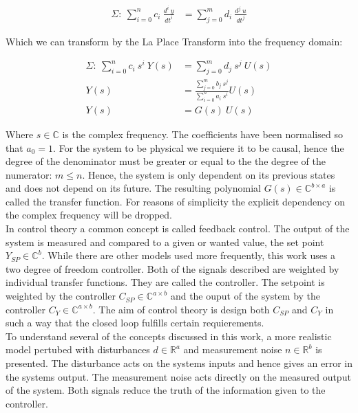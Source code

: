 \begin{align}
\label{eq:lti}
\Sigma:~\sum_{i=0}^{n} c_i ~\frac{d^i ~y}{dt^i} &= \sum_{j=0}^{m} d_i ~ \frac{d^j ~u}{dt^j} 
\end{align}

Which we can transform by the La Place Transform into the frequency domain:

\begin{align}
\label{eq:ltis}
\Sigma: ~\sum_{i=0}^{n} c_i ~s^i~Y(s) &= \sum_{j=0}^{m} d_j ~s^j~U(s)  \\
Y(s) &= \frac{\sum_{j=0}^{m} b_j ~s^j}{\sum_{i=0}^{n} a_i ~s^i} U(s) \\
Y(s) &= G(s) ~U(s)
\end{align}

Where $s \in \mathbb{C}$ is the complex frequency. The coefficients have been normalised so that $a_0 = 1$. For the system to be physical  we requiere it to be causal, hence the degree of the denominator must be greater or equal to the the degree of the numerator: $m \leq n$. Hence, the system is only dependent on its previous states and does not depend on its future. The resulting polynomial $G(s) \in \mathbb{C}^{b \times a}$ is called the transfer function. For reasons of simplicity the explicit dependency on the complex frequency will be dropped.\\

In control theory a common concept is called feedback control. The output of the system is measured and compared to a given or wanted value, the set point $Y_{SP} \in \mathbb{C}^b$. While there are other models used more frequently, this work uses a two degree of freedom controller. Both of the signals described are weighted by individual transfer functions. They are called the controller. The setpoint is weighted by the controller $C_{SP} \in \mathbb{C}^{a \times b}$ and the ouput of the system by the controller $C_{Y} \in \mathbb{C}^{a \times b}$. The aim of control theory is design both $C_{SP}$ and $C_{Y}$ in such a way that the closed loop fulfills certain requierements.\\


To understand several of the concepts discussed in this work, a more realistic model pertubed with disturbances $d \in \mathbb{R}^a$ and measurement noise $n \in \mathbb{R}^b$ is presented. The disturbance acts on the systems inputs and hence gives an error in the systems output. The measurement noise acts directly on the measured output of the system. Both signals reduce the truth of the information given to the controller. \\

